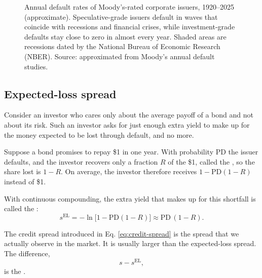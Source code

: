\begin{figure}[htbp]
\caption{Annual default rates of Moody's-rated corporate issuers, 1920--2025 (approximate). Speculative-grade issuers default in waves that coincide with recessions and financial crises, while investment-grade defaults stay close to zero in almost every year. Shaded areas are recessions dated by the National Bureau of Economic Research (NBER). Source: approximated from Moody's annual default studies.}
\label{fig:default-rates-time}
\end{figure}


\subsection{Expected-loss spread}

Consider an investor who cares only about the average payoff of a bond and not about its risk. Such an investor asks for just enough extra yield to make up for the money expected to be lost through default, and no more. 

Suppose a bond promises to repay \$1 in one year. With probability PD the issuer defaults, and the investor recovers only a fraction $R$ of the \$1, called the , so the share lost is $1-R$. On average, the investor therefore receives $1 - \text{PD}(1-R)$ instead of \$1. 



With continuous compounding, the extra yield that makes up for this shortfall is called the :
\begin{equation}
  s^{\text{EL}} = -\ln\bigl[1 - \text{PD}(1-R)\bigr] \approx \text{PD}\,(1-R).
  \label{eq:expected-loss-spread}
\end{equation}

The credit spread introduced in Eq. \ref{eq:credit-spread} is the spread that we actually observe in the market. It is usually larger than the expected-loss spread. The difference,
\begin{equation}
  s - s^{\text{EL}},
  \label{eq:credit-risk-premium}
\end{equation}
is the . 

